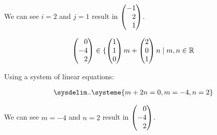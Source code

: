 \documentclass[12pt]{article}
\newenvironment{abc}{\begin{enumerate}[label={\bf(\alph*)}]}{\end{enumerate}}
\newcommand\m[2][]{
	\ifthenelse{\equal {#1} {}}
		{\begin{pmatrix*}[r]#2\end{pmatrix*}}
		{\left(\begin{array}{#1}#2\end{array}\right)}
}
\newcommand\resetequation[1][1]{\setcounter{equation}{#1 - 1}}
\begin{document}
\begin{abc}
\begin{item}
	We can see $i = 2$ and $j = 1$ result in $\m{-1 \\ 2 \\ 1}$.
	\end{item}

	\begin{item}
	\resetequation

	\begin{equation}
	\begin{aligned}
		\m{0 \\ -4 \\ 2} \in \{ \m{1 \\ 1 \\ 0} m + \m{2 \\ 0 \\ 1}n \mid m, n \in \mathbb{R}
	\end{aligned}
	\end{equation}
	
	Using a system of linear equations:

	\begin{equation}
	\begin{aligned}
		\sysdelim..\systeme{m + 2n = 0, m = -4, n = 2}
	\end{aligned}
	\end{equation}
	
	We can see $m = -4$ and $n = 2$ result in $\m{0 \\ -4 \\ 2}$.
	\end{item}
\end{abc}
\end{document}
